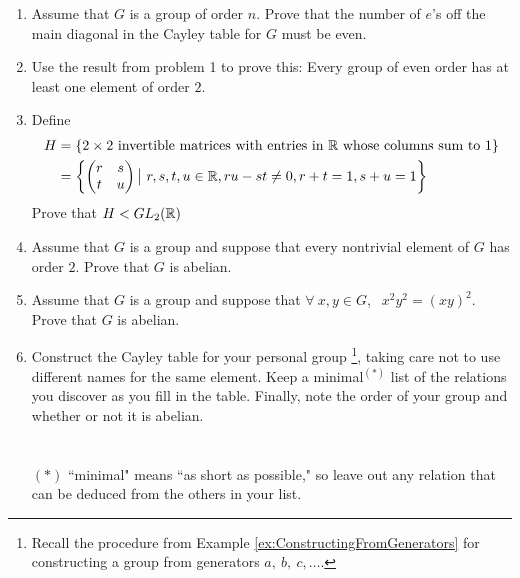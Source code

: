 \begin{enumerate}
    \item Assume that $G$ is a group of order $n$. Prove that the number of $e$'s off the main diagonal in the Cayley table for $G$ must be even. \\ \steezybreak
    
    \item Use the result from problem 1 to prove this: Every group of even order has at least one element of order $2$. \\ \steezybreak
    
    \item Define
    \begin{align}
        H&= \{2\times 2 \text{ invertible matrices with entries in }{\mathbb{ R}}\text{ whose columns sum to }1\} \nonumber \\
        &= \left \{\begin{pmatrix}
            r&s\\t&u
        \end{pmatrix}\big | \ r,s,t,u \in {\mathbb{ R}}, ru-st\neq 0, r+t=1, s+u=1 \right \} \nonumber
    \end{align}
    Prove that $H<GL_2({\mathbb{ R}})$ \\ \steezybreak

    \item Assume that $G$ is a group and suppose that every nontrivial element of $G$ has order $2$. Prove that $G$ is abelian. \\ \steezybreak
    
    \item Assume that $G$ is a group and suppose that $\forall \ x,y \in G$, $\ \ x^2y^2=(xy)^2$. Prove that $G$ is abelian. \\ \steezybreak
    
    \item Construct the Cayley table for your personal group \footnote{Recall the procedure from Example \ref{ex:ConstructingFromGenerators} for constructing a group from generators $a,\ b,\ c,\ldots$.}, taking care not to use different names for the same element. Keep a minimal$^{(*)}$ list of the relations you discover as you fill in the table. Finally, note the order of your group and whether or not it is abelian. \\ \\ \\ $(*)$ ``minimal" means ``as short as possible," so leave out any relation that can be deduced from the others in your list.
\end{enumerate}
\newpage
